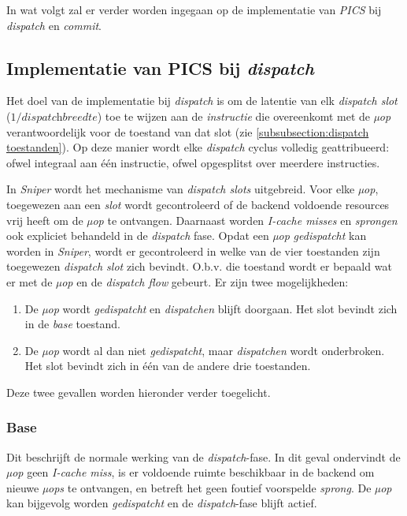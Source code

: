 \documentclass[12pt,a4paper,faculty=ea,language=nl]{ugent-doc}
\begin{document}
In wat volgt zal er verder worden ingegaan op de implementatie van \textit{PICS} bij \textit{dispatch} en \textit{commit}.
\subsection{Implementatie van PICS bij \textit{dispatch}}
\label{subsection:PICS bij dispatch}

Het doel van de implementatie bij \textit{dispatch} is om de latentie van elk \textit{dispatch slot} (\(1 / \textit{dispatchbreedte}\)) toe te wijzen aan de \textit{instructie} die overeenkomt met de \textit{µop} verantwoordelijk voor de toestand van dat slot (zie \ref{subsubsection:dispatch toestanden}).
Op deze manier wordt elke \textit{dispatch} cyclus volledig geattribueerd: ofwel integraal aan één instructie, ofwel opgesplitst over meerdere instructies.

In \textit{Sniper} wordt het mechanisme van \textit{dispatch slots} uitgebreid. Voor elke \textit{µop}, toegewezen aan een \textit{slot} wordt gecontroleerd of de backend voldoende resources vrij heeft om de \textit{µop} te ontvangen.
Daarnaast worden \textit{I-cache misses} en \textit{sprongen} ook expliciet behandeld in de \textit{dispatch} fase.
Opdat een \textit{µop} \textit{gedispatcht} kan worden in \textit{Sniper}, wordt er gecontroleerd in welke van de vier toestanden zijn toegewezen \textit{dispatch slot} zich bevindt.
O.b.v. die toestand wordt er bepaald wat er met de \textit{µop} en de \textit{dispatch flow} gebeurt. Er zijn twee mogelijkheden:
\begin{enumerate}
    \item De \textit{µop} wordt \textit{gedispatcht} en \textit{dispatchen} blijft doorgaan. Het slot bevindt zich in de \textit{base} toestand.
    \item De \textit{µop} wordt al dan niet \textit{gedispatcht}, maar \textit{dispatchen} wordt onderbroken. Het slot bevindt zich in één van de andere drie toestanden.
\end{enumerate}

Deze twee gevallen worden hieronder verder toegelicht.

\subsubsection{Base}


Dit beschrijft de normale werking van de \textit{dispatch}-fase. In dit geval ondervindt de \textit{µop} geen \textit{I-cache miss}, is er voldoende ruimte beschikbaar in de backend om nieuwe \textit{µops} te ontvangen, en betreft het geen foutief voorspelde \textit{sprong}. De \textit{µop} kan bijgevolg worden \textit{gedispatcht} en de \textit{dispatch}-fase blijft actief.
\end{document}
